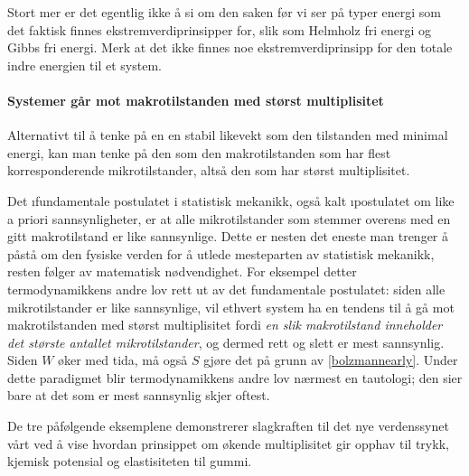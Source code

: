 Stort mer er det egentlig ikke å si om den saken før vi ser på typer energi som det faktisk finnes ekstremverdiprinsipper for, slik som Helmholz fri energi og Gibbs fri energi. Merk at det ikke finnes noe ekstremverdiprinsipp for den totale indre energien til et system.


\paragraph{Systemer går mot makrotilstanden med størst multiplisitet} Alternativt til å tenke på en en stabil likevekt som den tilstanden med minimal energi, kan man tenke på den som den makrotilstanden som har flest korresponderende mikrotilstander, altså den som har størst multiplisitet. 

Det \i{fundamentale postulatet i statistisk mekanikk}, også kalt \i{postulatet om like a priori sannsynligheter}, er at alle mikrotilstander som stemmer overens med en gitt makrotilstand er like sannsynlige. Dette er nesten det eneste man trenger å påstå om den fysiske verden for å utlede mesteparten av statistisk mekanikk, resten følger av matematisk nødvendighet. For eksempel detter termodynamikkens andre lov rett ut av det fundamentale postulatet: siden alle mikrotilstander er like sannsynlige, vil ethvert system ha en tendens til å gå mot makrotilstanden med størst multiplisitet fordi \emph{en slik makrotilstand inneholder det største antallet mikrotilstander}, og dermed rett og slett er mest sannsynlig. Siden $W$ øker med tida, må også $S$ gjøre det på grunn av \eqref{bolzmannearly}. Under dette paradigmet blir termodynamikkens andre lov nærmest en tautologi; den sier bare at det som er mest sannsynlig skjer oftest.

De tre påfølgende eksemplene demonstrerer slagkraften til det nye verdenssynet vårt ved å vise hvordan prinsippet om økende multiplisitet gir opphav til trykk, kjemisk potensial og elastisiteten til gummi.

